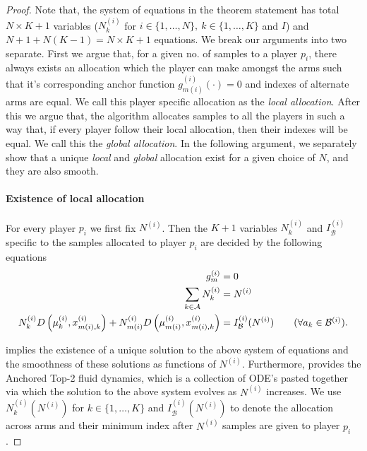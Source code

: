 \documentclass{article}
\begin{document}
\begin{proof}

    Note that, the system of equations in the theorem statement has total $N\times K+1$ variables ($N_k^{(i)}$ for $i\in\{1,\dots,N\},~k\in\{1,\dots,K\}$ and $I$) and $N+1+N(K-1)=N\times K+1$ equations. We break our arguments into two separate. First we argue that, for a given no. of samples to a player $p_i$, there always exists an allocation which the player can make amongst the arms such that it's corresponding anchor function $g^{(i)}_{m(i)}(\cdot)=0$ and indexes of alternate arms are equal. We call this player specific allocation as the \emph{local allocation}. After this we argue that, the algorithm allocates samples to all the players in such a way that, if every player follow their local allocation, then their indexes will be equal. We call this the \emph{global allocation}. In the following argument, we separately show that a unique  \emph{local} and \emph{global} allocation exist for a given choice of $N$, and they are also smooth. 
    
    

    \paragraph{Existence of local allocation} For every player $p_i$ we first fix  $N^{(i)}$. Then the $K+1$ variables $N^{(i)}_k$ and $I^{(i)}_{\mathcal{B}}$ specific to the samples allocated to player $p_i$ are decided by the following equations
    \begin{align*}
       g^{(i)}_m &= 0\\
       \sum_{k\in\mathcal{A}}N^{(i)}_k &= N^{(i)}\\
       N^{(i)}_{k}D\left(\mu^{(i)}_{k},x^{(i)}_{m(i),k}\right)+N^{(i)}_{m(i)}D\left(\mu^{(i)}_{m(i)},x^{(i)}_{m(i),k}\right) &= I^{(i)}_{\mathcal{B}}(N^{(i)})\tag{$\forall a_k\in\mathcal{B}^{(i)}$}.
    \end{align*}

    \cite[Proposition 2.1]{bandyopadhyay2024optimal} implies the existence of a unique solution to the above system of equations and the smoothness of these solutions as functions of $N^{(i)}$. Furthermore, \cite[Theorem 4.1]{bandyopadhyay2024optimal} provides the Anchored Top-2 fluid dynamics, which is a collection of ODE's pasted together via which the solution to the above system evolves as $N^{(i)}$ increases. We use $N_k^{(i)}(N^{(i)})$ for $k\in\{1,\dots,K\}$ and $I_{\mathcal{B}}^{(i)}(N^{(i)})$ to denote the allocation across arms and their minimum index after $N^{(i)}$ samples are given to player $p_i$.
    

\end{proof}
\end{document}
